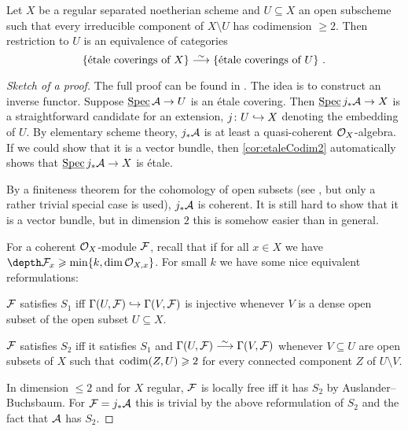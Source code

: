 \documentclass[a4paper, 10pt, oneside, DIV=9, chapterprefix=true, numbers=enddot, bibliography=totoc]{scrbook}
\begin{document}
\begin{thm}
	Let $X$ be a regular separated noetherian scheme and $U\subseteq X$ an open subscheme such that every irreducible component of $X\setminus U$ has codimension $\geq 2$. Then restriction to $U$ is an equivalence of categories
	\begin{equation*}
		\left\{\text{étale coverings of $X$}\right\}\isomorphism\left\{\text{étale coverings of $U$}\right\}\,.
	\end{equation*}
\end{thm}
\begin{proof}[Sketch of a proof]
	The full proof can be found in \cite[Exposé~X Théorème~3.4]{sga1}. The idea is to construct an inverse functor. Suppose $\SPEC\Aa\morphism U$ is an étale covering. Then $\SPEC j_*\Aa\morphism X$ is a straightforward candidate for an extension, $j\colon U\monomorphism X$ denoting the embedding of $U$. By elementary scheme theory, $j_*\mathcal{A}$ is at least a quasi-coherent $\mathcal{O}_X$-algebra. If we could show that it is a vector bundle, then \cref{cor:etaleCodim2} automatically shows that $\SPEC j_*\Aa\morphism X$ is étale.
	
	By  a finiteness theorem for the cohomology of open subsets (see \cite{sga2}, but only a rather trivial special case is used), $j_*\mathcal{A}$ is coherent. It is still hard to show that it is a vector bundle, but in dimension $2$ this is somehow easier than in general.
	
	For a coherent $\mathcal{O}_X$-module $\mathcal{F}$, recall that  if for all $x\in X$ we have $\depth\Ff_x\geq \min\{k,\dim\Oo_{X,x}\}$. For small $k$ we have some nice equivalent reformulations:
	\begin{numerate}
		\item $\mathcal{F}$ satisfies $S_1$ iff $\Gamma(U,\Ff)\monomorphism\Gamma(V,\Ff)$ is injective whenever $V$ is a dense open subset of the open subset $U\subseteq X$.
		\item $\mathcal{F}$ satisfies $S_2$ iff it satisfies $S_1$ and $\Gamma(U,\Ff)\isomorphism\Gamma(V,\Ff)$ whenever $V\subseteq U$ are open subsets of $X$ such that $\operatorname{codim}(Z,U)\geqslant 2$ for every connected component $Z$ of $U\setminus V$.
	\end{numerate}
	In dimension $\leq 2$ and for $X$ regular, $\mathcal{F}$ is locally free iff it has $S_2$ by Auslander--Buchsbaum. For $\mathcal{F}=j_*\mathcal{A}$ this is trivial by the above reformulation of $S_2$ and the fact that $\mathcal{A}$ has $S_2$.
	

\end{proof}
\end{document}
